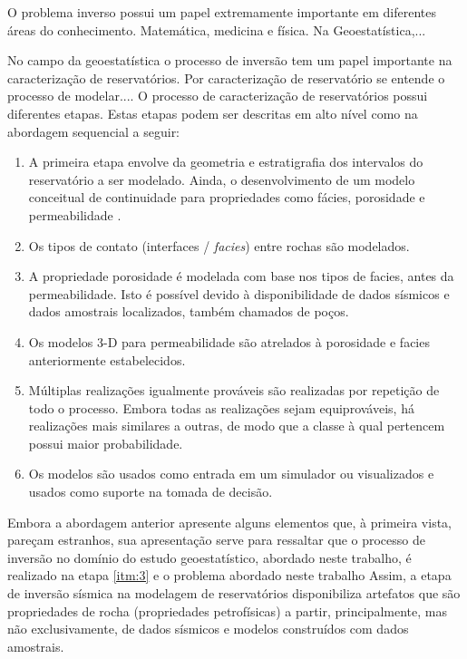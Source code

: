 O problema inverso possui um papel extremamente importante em diferentes áreas do conhecimento.
Matemática, medicina e física. Na Geoestatística,...


No campo da geoestatística o processo de inversão tem um papel importante na caracterização
de reservatórios. Por caracterização de reservatório se entende o processo de modelar....
O processo de caracterização de reservatórios possui diferentes
etapas. Estas etapas podem ser descritas em alto nível como na
abordagem sequencial a seguir:
\begin{enumerate}
 \item A primeira etapa envolve da geometria e estratigrafia dos intervalos do reservatório
 a ser modelado. Ainda, o desenvolvimento de um modelo conceitual de continuidade para
 propriedades como fácies, porosidade e permeabilidade \label{itm:1}.
 \item Os tipos de contato (interfaces / \textit{facies}) entre rochas são modelados\label{itm:2}.
 \item A propriedade porosidade é modelada com base nos tipos de facies, antes da permeabilidade.
 Isto é possível devido à disponibilidade de dados sísmicos e dados amostrais localizados, também chamados de poços\label{itm:3}.
 \item Os modelos 3-D para permeabilidade são atrelados à porosidade e facies anteriormente estabelecidos\label{itm:4}.
 \item Múltiplas realizações igualmente prováveis são realizadas por repetição de todo o processo. Embora todas as
 realizações sejam equiprováveis, há realizações mais similares a outras, de modo que a classe à qual pertencem possui
 maior probabilidade\label{itm:5}.
 \item Os modelos são usados como entrada em um simulador ou visualizados e usados como suporte na tomada de decisão\label{itm:6}.
\end{enumerate}

Embora a abordagem anterior apresente alguns elementos que, à primeira vista, pareçam estranhos, sua apresentação 
serve para ressaltar que o processo de inversão no domínio do estudo geoestatístico, abordado neste
trabalho, é realizado na etapa \ref{itm:3} e o problema abordado neste trabalho 
Assim, a etapa de inversão sísmica na modelagem de reservatórios disponibiliza artefatos que
são propriedades de rocha (propriedades petrofísicas) a partir, principalmente, mas não exclusivamente,
de dados sísmicos e modelos construídos com dados amostrais.

